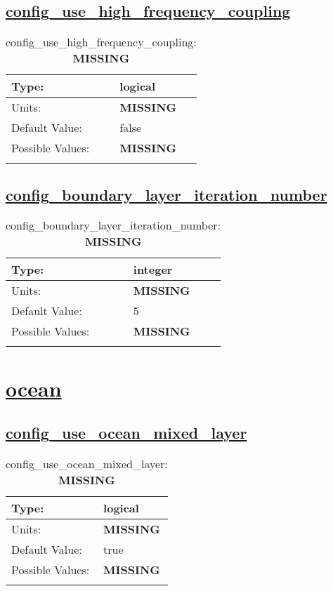 \subsection[config\_use\_high\_frequency\_coupling]{\hyperref[sec:nm_tab_atmosphere]{config\_use\_high\_frequency\_coupling}}
\label{subsec:nm_sec_config_use_high_frequency_coupling}
\begin{center}
\begin{longtable}{| p{2.0in} || p{4.0in} |}
    \hline
    Type: & logical \\
    \hline
    Units: & {\bf \color{red} MISSING} \\
    \hline
    Default Value: & false \\
    \hline
    Possible Values: & {\bf \color{red} MISSING} \\
    \hline
    \caption{config\_use\_high\_frequency\_coupling: {\bf \color{red} MISSING}}
\end{longtable}
\end{center}
\subsection[config\_boundary\_layer\_iteration\_number]{\hyperref[sec:nm_tab_atmosphere]{config\_boundary\_layer\_iteration\_number}}
\label{subsec:nm_sec_config_boundary_layer_iteration_number}
\begin{center}
\begin{longtable}{| p{2.0in} || p{4.0in} |}
    \hline
    Type: & integer \\
    \hline
    Units: & {\bf \color{red} MISSING} \\
    \hline
    Default Value: & 5 \\
    \hline
    Possible Values: & {\bf \color{red} MISSING} \\
    \hline
    \caption{config\_boundary\_layer\_iteration\_number: {\bf \color{red} MISSING}}
\end{longtable}
\end{center}
\section[ocean]{\hyperref[sec:nm_tab_ocean]{ocean}}
\label{sec:nm_sec_ocean}
\subsection[config\_use\_ocean\_mixed\_layer]{\hyperref[sec:nm_tab_ocean]{config\_use\_ocean\_mixed\_layer}}
\label{subsec:nm_sec_config_use_ocean_mixed_layer}
\begin{center}
\begin{longtable}{| p{2.0in} || p{4.0in} |}
    \hline
    Type: & logical \\
    \hline
    Units: & {\bf \color{red} MISSING} \\
    \hline
    Default Value: & true \\
    \hline
    Possible Values: & {\bf \color{red} MISSING} \\
    \hline
    \caption{config\_use\_ocean\_mixed\_layer: {\bf \color{red} MISSING}}
\end{longtable}
\end{center}
